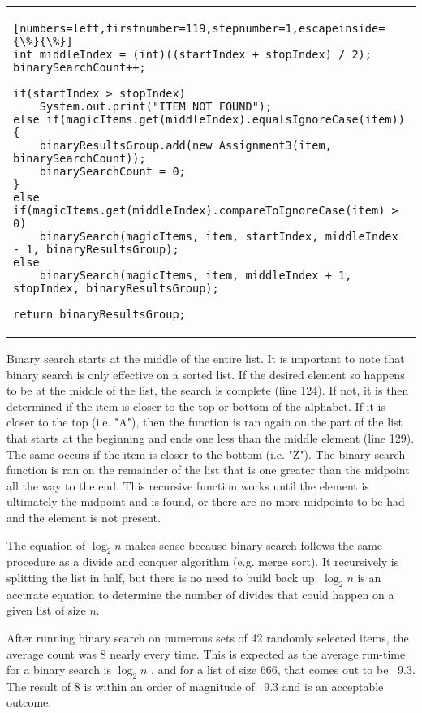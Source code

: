 \documentclass[letterpaper, 10pt,DIV=13]{scrartcl}
\numberwithin{equation}{section} %
\numberwithin{figure}{section} %
\numberwithin{table}{section} %
\begin{document}
\begin{center}
\begin{tabular}{l}
\begin{lstlisting}[numbers=left,firstnumber=119,stepnumber=1,escapeinside={\%}{\%}]
int middleIndex = (int)((startIndex + stopIndex) / 2);  
binarySearchCount++;

if(startIndex > stopIndex)
    System.out.print("ITEM NOT FOUND");
else if(magicItems.get(middleIndex).equalsIgnoreCase(item))
{
    binaryResultsGroup.add(new Assignment3(item, binarySearchCount));
    binarySearchCount = 0;
}
else if(magicItems.get(middleIndex).compareToIgnoreCase(item) > 0) 
    binarySearch(magicItems, item, startIndex, middleIndex - 1, binaryResultsGroup);
else
    binarySearch(magicItems, item, middleIndex + 1, stopIndex, binaryResultsGroup);

return binaryResultsGroup;
\end{lstlisting}
\end{tabular}
\end{center}\textbf{}

Binary search starts at the middle of the entire list.  It is important to note that binary search is only effective on a sorted list.  If the desired element so happens to be at the middle of the list, the search is complete (line 124).  If not, it is then determined if the item is closer to the top or bottom of the alphabet.  If it is closer to the top (i.e. "A"), then the function is ran again on the part of the list that starts at the beginning and ends one less than the middle element (line 129).  The same occurs if the item is closer to the bottom (i.e. "Z").  The binary search function is ran on the remainder of the list that is one greater than the midpoint all the way to the end.  This recursive function works until the element is ultimately the midpoint and is found, or there are no more midpoints to be had and the element is not present.

The equation of $\log_2 n$ makes sense because binary search follows the same procedure as a divide and conquer algorithm (e.g. merge sort).  It recursively is splitting the list in half, but there is no need to build back up.  $\log_2 n$ is an accurate equation to determine the number of divides that could happen on a given list of size $n$.

After running binary search on numerous sets of 42 randomly selected items, the average count was 8 nearly every time.  This is expected as the average run-time for a binary search is $\log_2 n$ , and for a list of size 666, that comes out to be ~9.3.  The result of 8 is within an order of magnitude of ~9.3 and is an acceptable outcome.
\end{document}
